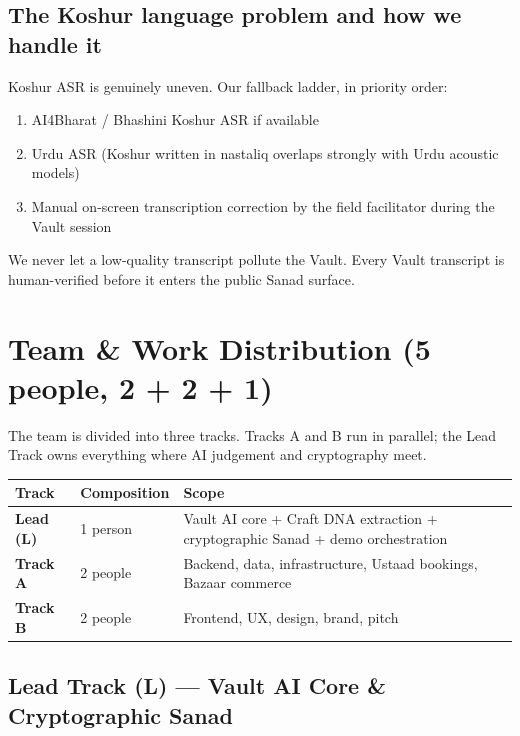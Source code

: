 \documentclass[11pt, a4paper]{article}
\begin{document}
\subsection{The Koshur language problem and how we handle it}

Koshur ASR is genuinely uneven. Our fallback ladder, in priority order:
\begin{enumerate}
  \item AI4Bharat / Bhashini Koshur ASR if available
  \item Urdu ASR (Koshur written in nastaliq overlaps strongly with Urdu acoustic models)
  \item Manual on-screen transcription correction by the field facilitator during the Vault session
\end{enumerate}
We never let a low-quality transcript pollute the Vault. Every Vault transcript is human-verified before it enters the public Sanad surface.

\section{Team \& Work Distribution (5 people, 2 + 2 + 1)}

The team is divided into three tracks. Tracks A and B run in parallel; the Lead Track owns everything where AI judgement and cryptography meet.

\begin{center}
\small
\begin{tabularx}{\linewidth}{>{\bfseries}lXX}
\toprule
Track & Composition & Scope \\
\midrule
Lead (L) & 1 person & Vault AI core + Craft DNA extraction + cryptographic Sanad + demo orchestration \\
Track A & 2 people & Backend, data, infrastructure, Ustaad bookings, Bazaar commerce \\
Track B & 2 people & Frontend, UX, design, brand, pitch \\
\bottomrule
\end{tabularx}
\end{center}

\subsection{Lead Track (L) --- Vault AI Core \& Cryptographic Sanad}
\end{document}
